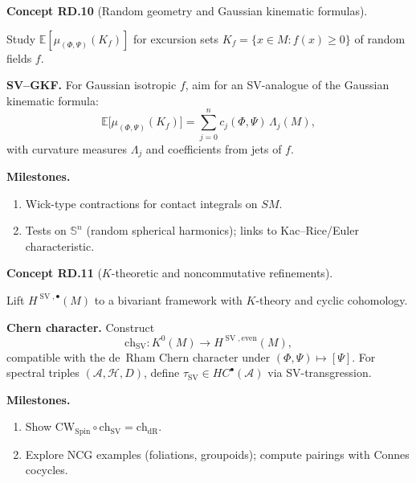 \documentclass[10pt, letterpaper]{article}
\newcommand{\Spin}{\mathrm{Spin}}
\newcommand{\CustomHeading}[3]{%
  \par\medskip\noindent%
  \textbf{#1 #2} \textnormal{(#3)}.\enskip%
}
\newenvironment{CONC}[2]{\begin{unitbox}\CustomHeading{Concept}{#1}{#2}}{\end{unitbox}}
\begin{document}
\begin{CONC}{RD.10}{Random geometry and Gaussian kinematic formulas}
Study $\mathbb E[\mu_{(\Phi,\Psi)}(K_f)]$ for excursion sets $K_f=\{x\in M: f(x)\ge 0\}$ of random fields $f$.

\medskip\noindent\textbf{SV–GKF.}
For Gaussian isotropic $f$, aim for an SV-analogue of the Gaussian kinematic formula:
\[
\mathbb E\big[\mu_{(\Phi,\Psi)}(K_f)\big]=\sum_{j=0}^n c_j(\Phi,\Psi)\,\Lambda_j(M),
\]
with curvature measures $\Lambda_j$ and coefficients from jets of $f$.

\medskip\noindent\textbf{Milestones.}
\begin{enumerate}[label=(\roman*)]
\item Wick-type contractions for contact integrals on $SM$.
\item Tests on $\mathbb S^n$ (random spherical harmonics); links to Kac–Rice/Euler characteristic.
\end{enumerate}
\end{CONC}

\begin{CONC}{RD.11}{$K$-theoretic and noncommutative refinements}
Lift $H^{\operatorname{SV},\bullet}(M)$ to a bivariant framework with $K$-theory and cyclic cohomology.

\medskip\noindent\textbf{Chern character.}
Construct
\[
\mathrm{ch}_{\operatorname{SV}}:K^0(M)\longrightarrow H^{\operatorname{SV},\mathrm{even}}(M),
\]
compatible with the de~Rham Chern character under $(\Phi,\Psi)\mapsto[\Psi]$.
For spectral triples $(\mathcal A,\mathcal H,D)$, define $\tau_{\operatorname{SV}}\in HC^{\bullet}(\mathcal A)$ via SV-transgression.

\medskip\noindent\textbf{Milestones.}
\begin{enumerate}[label=(\roman*)]
\item Show $\mathrm{CW}_{\Spin}\circ \mathrm{ch}_{\operatorname{SV}}=\mathrm{ch}_{\mathrm{dR}}$.
\item Explore NCG examples (foliations, groupoids); compute pairings with Connes cocycles.
\end{enumerate}
\end{CONC}
\end{document}
